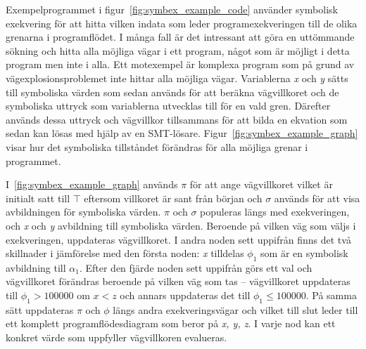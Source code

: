 Exempelprogrammet i figur~\ref{fig:symbex_example_code} använder symbolisk
exekvering för att hitta vilken indata som leder programexekveringen till de
olika grenarna i programflödet. I många fall är det intressant att göra en
uttömmande sökning och hitta alla möjliga vägar i ett program, något som är
möjligt i detta program men inte i alla. Ett motexempel är komplexa
program som på grund av vägexplosionsproblemet inte hittar alla möjliga vägar.
Variablerna \emph{x} och \emph{y} sätts till symboliska värden som sedan används
för att beräkna vägvillkoret och de symboliska uttryck som variablerna utvecklas
till för en vald gren. Därefter används dessa uttryck och vägvillkor
tillsammans för att bilda en ekvation som sedan kan lösas med hjälp av en SMT-lösare.
Figur~\ref{fig:symbex_example_graph} visar
hur det symboliska tillståndet förändras för alla möjliga grenar i programmet.

I~\ref{fig:symbex_example_graph} används $\pi$ för att ange vägvillkoret vilket
är initialt satt till $\top$ eftersom villkoret är sant från början och $\sigma$
används för att visa avbildningen för symboliska värden. $\pi$ och $\sigma$ %
populeras längs med exekveringen, och \emph{x} och \emph{y} avbildning till
symboliska värden. Beroende på vilken väg som väljs i exekveringen, uppdateras
vägvillkoret. I andra noden sett uppifrån finns det två skillnader i jämförelse
med den första noden: \emph{x} tilldelas $\phi_1$ som är en symbolisk avbildning
till $\alpha_1$. Efter den fjärde noden sett uppifrån görs ett val och
vägvillkoret förändras beroende på vilken väg som tas -- vägvillkoret uppdateras
till $\phi_1 > 100000$ om $x < z$ och annars uppdateras det till $\phi_1 \leq
    100000$. På samma sätt uppdateras $\pi$ och $\phi$ längs andra exekveringsvägar
och vilket till slut leder till ett komplett programflödesdiagram som beror på
\emph{x, y, z}. I varje nod kan ett konkret värde som uppfyller vägvillkoren evalueras.
